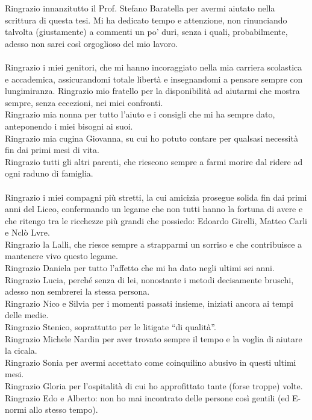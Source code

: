 \documentclass[12pt,a4paper]{report}
\theoremstyle{definition}
\begin{document}
Ringrazio innanzitutto il Prof. Stefano Baratella per avermi aiutato nella scrittura di questa tesi. Mi ha dedicato tempo e attenzione, non rinunciando talvolta (giustamente) a commenti un po' duri, senza i quali, probabilmente, adesso non sarei così orgoglioso del mio lavoro.\\
\\
Ringrazio i miei genitori, che mi hanno incoraggiato nella mia carriera scolastica e accademica, assicurandomi totale libertà e insegnandomi a pensare sempre con lungimiranza. Ringrazio mio fratello per la disponibilità ad aiutarmi che mostra sempre, senza eccezioni, nei miei confronti.\\
Ringrazio mia nonna per tutto l'aiuto e i consigli che mi ha sempre dato, anteponendo i miei bisogni ai suoi.\\
Ringrazio mia cugina Giovanna, su cui ho potuto contare per qualsasi necessità fin dai primi mesi di vita.\\
Ringrazio tutti gli altri parenti, che riescono sempre a farmi morire dal ridere ad ogni raduno di famiglia.\\
\\
Ringrazio i miei compagni più stretti, la cui amicizia prosegue solida fin dai primi anni del Liceo, confermando un legame che non tutti hanno la fortuna di avere e che ritengo tra le ricchezze più grandi che possiedo: Edoardo Girelli, Matteo Carli e Nclò Lvre.\\
Ringrazio la Lalli, che riesce sempre a strapparmi un sorriso e che contribuisce a mantenere vivo questo legame.\\
Ringrazio Daniela per tutto l'affetto che mi ha dato negli ultimi sei anni.\\
Ringrazio Lucia, perché senza di lei, nonostante i metodi decisamente bruschi, adesso non sembrerei la stessa persona.\\
Ringrazio Nico e Silvia per i momenti passati insieme, iniziati ancora ai tempi delle medie.\\
Ringrazio Stenico, soprattutto per le litigate ``di qualità''.\\
Ringrazio Michele Nardin per aver trovato sempre il tempo e la voglia di aiutare la cicala.\\
Ringrazio Sonia per avermi accettato come coinquilino abusivo in questi ultimi mesi.\\
Ringrazio Gloria per l'ospitalità di cui ho approfittato tante (forse troppe) volte.\\
Ringrazio Edo e Alberto: non ho mai incontrato delle persone così gentili (ed E-normi allo stesso tempo).\\
\end{document}
